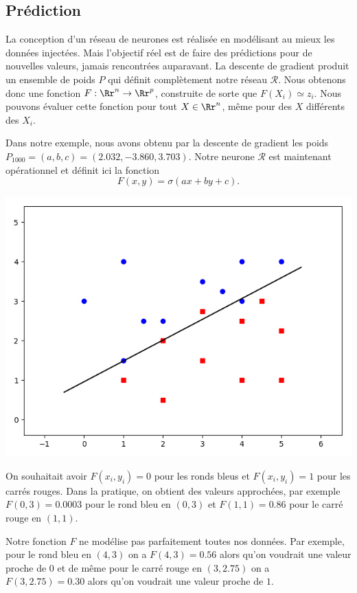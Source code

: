 \subsection{Prédiction}

La conception d'un réseau de neurones est réalisée en modélisant au mieux les données injectées. Mais l'objectif réel est de faire des prédictions pour de nouvelles valeurs, jamais rencontrées auparavant.
La descente de gradient produit un ensemble de poids $P$ qui définit complètement notre réseau $\mathcal{R}$.
Nous obtenons donc une fonction $F : \Rr^n \to \Rr^p$, construite de sorte que $F(X_i) \simeq z_i$.
Nous pouvons évaluer cette fonction pour tout $X \in \Rr^n$, même pour des $X$ différents des $X_i$.


\begin{exemple}{}{}
	Dans notre exemple, nous avons obtenu par la descente de gradient les poids $P_{1000} = (a,b,c) = (2.032, -3.860, 3.703)$.
	Notre neurone $\mathcal{R}$ est maintenant opérationnel et définit ici la fonction 
	$$F(x,y) = \sigma(ax+by+c).$$
	
	\begin{center}
		\includegraphics[scale=\myscale,scale=0.45]{figures/retro_01_e}
	\end{center}
	
	On souhaitait avoir $F(x_i,y_i)=0$ pour les ronds bleus et $F(x_i,y_i)=1$ pour les carrés rouges.
	Dans la pratique, on obtient des valeurs approchées, par exemple $F(0,3)=0.0003$ pour le rond bleu en $(0,3)$ et $F(1,1)=0.86$ pour le carré rouge en $(1,1)$.
	
	Notre fonction $F$ ne modélise pas parfaitement toutes nos données. Par exemple, pour le rond bleu en $(4,3)$ on a $F(4,3) = 0.56$ alors qu'on voudrait une valeur proche de $0$ et de même pour le carré rouge en $(3,2.75)$ on a $F(3,2.75) = 0.30$ alors qu'on voudrait une valeur proche de $1$. 
	

\end{exemple}
